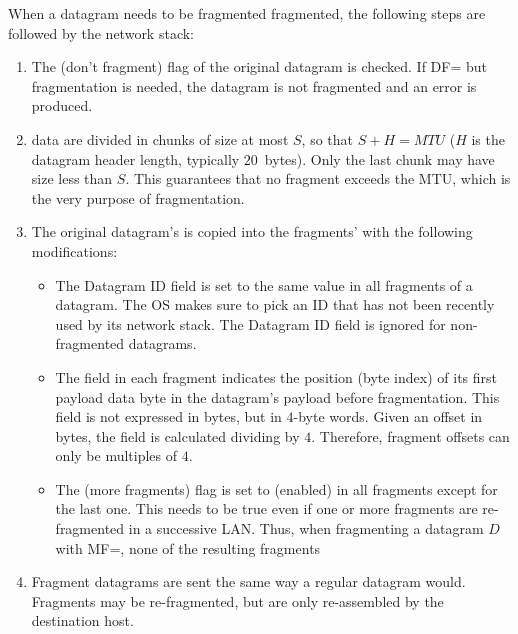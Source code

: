 When a datagram needs to be fragmented fragmented, the following steps are followed 
by the network stack:
\begin{enumerate}

\item The  (don't fragment) flag of the original datagram is checked. 
    If DF= but fragmentation is needed, the datagram is not fragmented 
    and an error is produced.\\[-0.2cm]

\item {} data are divided in chunks of size at most $S$, so that $S + H = MTU$ 
  ($H$ is the datagram header length, typically $20$~bytes). Only the last chunk
  may have size less than $S$. This guarantees that no fragment exceeds the MTU,
  which is the very purpose of fragmentation.\\[-0.2cm]
  
\item The original datagram's  is copied into the fragments' with the following modifications:
  \begin{itemize}
  \item The Datagram ID field is set to the same value in all fragments of a datagram. 
    The OS makes sure to pick an ID that has not been recently used by its network stack.
    The Datagram ID field is ignored for non-fragmented datagrams.\\[-0.3cm]
    
  \item The  field in each fragment indicates the position (byte index)
    of its first payload data byte in the datagram's payload before fragmentation.
    This field is not expressed in bytes, but in $4$-byte words.
    Given an offset in bytes, the  field is calculated dividing by $4$.
    Therefore, fragment offsets can only be multiples of $4$.\\[-0.3cm]
    
  \item The  (more fragments) flag is set to  (enabled) 
    in all fragments except for the last one. This needs to be true even if one or more
    fragments are re-fragmented in a successive LAN. Thus, when fragmenting a 
    datagram $D$ with MF=, none of the resulting fragments\\[-0.2cm]
  \end{itemize}
  
\item Fragment datagrams are sent the same way a regular datagram would.
  Fragments may be re-fragmented, but are only re-assembled by the destination host.
  
\end{enumerate}


